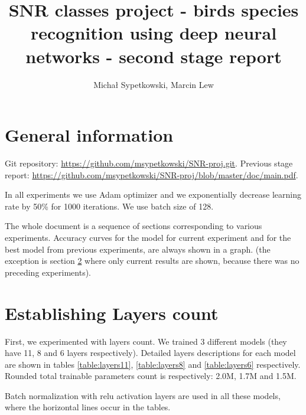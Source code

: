\documentclass[a4paper]{article}
\begin{document}
\title{SNR classes project - birds species recognition using deep neural networks
- second stage report}

\author{Michał Sypetkowski, Marcin Lew}
\twocolumn
\maketitle


\section{General information}
Git repository:\newline
\url{https://github.com/msypetkowski/SNR-proj.git}.\newline
Previous stage report: \newline
\url{https://github.com/msypetkowski/SNR-proj/blob/master/doc/main.pdf}.

In all experiments we use Adam optimizer and we exponentially
decrease learning rate by 50\% for 1000 iterations.
We use batch size of 128.

The whole document is a sequence of sections corresponding to various experiments. 
Accuracy curves for the model for current experiment and for the best model from previous experiments,
are always shown in a graph.
(the exception is section \ref{expLayer} where only current results are shown, because there was no preceding experiments).

\section{Establishing Layers count}
\label{expLayer}

First, we experimented with layers count.
    We trained 3 different models (they have 11, 8 and 6 layers respectively).
Detailed layers descriptions for each model are shown in tables
\ref{table:layers11},
\ref{table:layers8} and
\ref{table:layers6} respectively.
Rounded total trainable parameters count is respectively: 2.0M, 1.7M  and 1.5M.

Batch normalization with relu activation layers are used in all these models,
where the horizontal lines occur in the tables.
\end{document}
